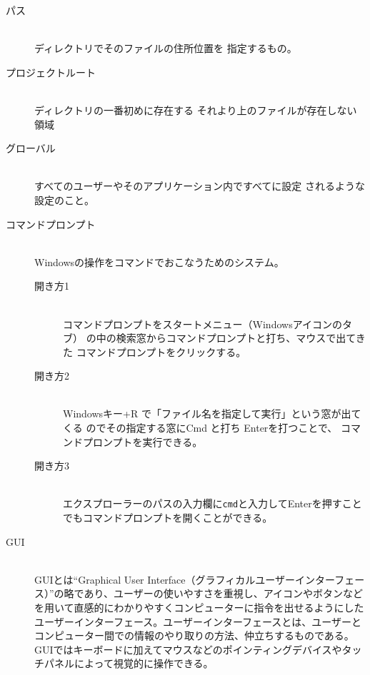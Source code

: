 \documentclass[titlepage]{ltjsarticle}
\begin{document}
\begin{description}
  \item [パス] ~\\
        ディレクトリでそのファイルの住所位置を
        指定するもの。
  \item [プロジェクトルート] ~\\
        ディレクトリの一番初めに存在する
        それより上のファイルが存在しない領域
  \item [グローバル] ~\\
        すべてのユーザーやそのアプリケーション内ですべてに設定
        されるような設定のこと。
  \item [コマンドプロンプト] ~\\
        Windowsの操作をコマンドでおこなうためのシステム。
        \begin{description}
          \item[開き方1] ~\\
            コマンドプロンプトをスタートメニュー（Windowsアイコンのタブ）
            の中の検索窓からコマンドプロンプトと打ち、マウスで出てきた
            コマンドプロンプトをクリックする。
          \item[開き方2] ~\\
            Windowsキー+R で「ファイル名を指定して実行」という窓が出てくる
            のでその指定する窓にCmd と打ち Enterを打つことで、
            コマンドプロンプトを実行できる。
            \item[開き方3]~\\
            エクスプローラーのパスの入力欄に\verb|cmd|と入力してEnterを押すことでもコマンドプロンプトを開くことができる。
        \end{description}
        \item[GUI]~\\
        GUIとは``Graphical User Interface（グラフィカルユーザーインターフェース）''の略であり、ユーザーの使いやすさを重視し、アイコンやボタンなどを用いて直感的にわかりやすくコンピューターに指令を出せるようにしたユーザーインターフェース。ユーザーインターフェースとは、ユーザーとコンピューター間での情報のやり取りの方法、仲立ちするものである。GUIではキーボードに加えてマウスなどのポインティングデバイスやタッチパネルによって視覚的に操作できる。

\end{description}
\end{document}
